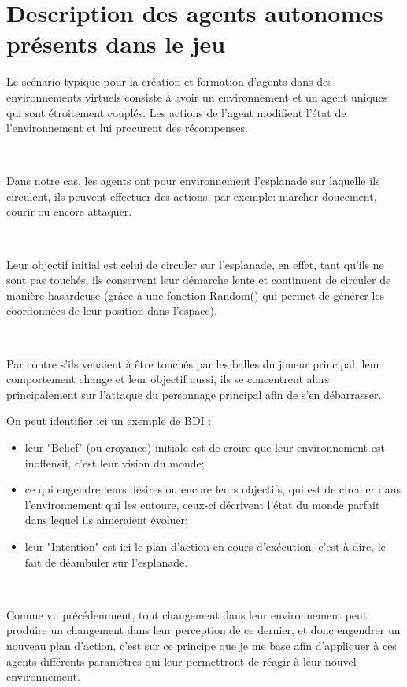 \section{Description des agents autonomes présents dans le jeu}

Le scénario typique pour la création et formation d’agents dans des environnements virtuels consiste à avoir un environnement et un agent uniques qui sont étroitement couplés. Les actions de l'agent modifient l'état de l'environnement et lui procurent des récompenses. \parencite{unity2}  

~\par
Dans notre cas, les agents ont pour environnement l’esplanade sur laquelle ils circulent, ils peuvent effectuer des actions, par exemple:  marcher doucement, courir ou encore attaquer.
 
 
~\par 
Leur objectif initial est celui de circuler sur l'esplanade, en effet, tant qu’ils ne sont pas touchés, ils conservent leur démarche lente et continuent de circuler de manière hasardeuse (grâce à une fonction Random() qui permet de générer les coordonnées de leur position dans l’espace).

~\par
Par contre s'ils venaient à être touchés par les balles du joueur principal, leur comportement change et leur objectif aussi, ils se concentrent alors principalement sur l’attaque du personnage principal afin de s’en débarrasser.

On peut identifier ici un exemple de BDI : 

\begin{itemize}
\item leur "Belief" (ou croyance) initiale est de croire que leur environnement est inoffensif, c’est leur vision du monde;
\item ce qui engendre leurs désires ou encore leurs objectifs, qui est de circuler dans l’environnement qui les entoure, ceux-ci décrivent l'état du monde parfait dans lequel ils aimeraient évoluer;
\item leur "Intention" est ici le plan d’action en cours d'exécution, c’est-à-dire, le fait de déambuler sur l’esplanade.
\end{itemize}


~\par
Comme vu précédemment, tout changement dans leur environnement peut produire un changement dans leur perception de ce dernier, et donc engendrer un nouveau plan d’action, c’est sur ce principe que je me base afin d’appliquer à ces agents différents paramètres qui leur permettront de réagir à leur nouvel environnement. 

